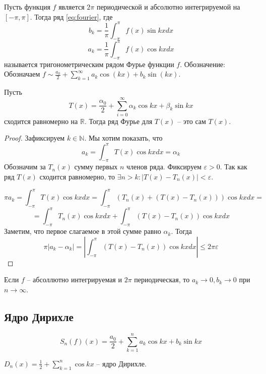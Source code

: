 \documentclass[document.tex]{subfiles}
\begin{document}
\begin{definition}
	Пусть функция $f$ является $2 \pi$ периодической и абсолютно интегрируемой на $[-\pi, \pi]$. Тогда ряд
    \ref{eq:fourier}, где
    $$b_k = \frac{1}{\pi}\int_{-\pi}^{\pi}f(x) \sin kx dx$$
	$$a_k = \frac{1}{\pi}\int_{-\pi}^{\pi}f(x) \cos kx dx$$
    называется тригонометрическим рядом Фурье функции $f$. Обозначение:
    Обозначаем $f \sim \frac{a_0}{2} + \sum_{k=1}^{\infty} a_k \cos(kx) + b_k \sin(kx)$.
\end{definition}

\begin{statement}
	Пусть $$T(x) = \frac{\alpha_0}{2} + \sum_{i=0}^{\infty} \alpha_k \cos kx + \beta_k \sin kx$$ сходится равномерно на $\mathbb{R}$. Тогда ряд Фурье для $T(x)$ -- это сам $T(x)$.
\end{statement}
\begin{proof}
    Зафиксируем $k \in \mathbb{N}$. Мы хотим показать, что 
    \[
        a_k = \int_{-\pi}^{\pi}T(x) \cos kxdx = \alpha_k
    \]
	Обозначим за $T_n(x)$ сумму первых $n$ членов ряда.
	Фиксируем $\varepsilon > 0$. Так как ряд $T(x)$ сходится равномерно, то $\exists n > k: |T(x) - T_n(x)| < \varepsilon$.

	$$\pi a_k = \int_{-\pi}^{\pi} T(x)\cos kx dx = \int_{-\pi}^{\pi} (T_n(x) + (T(x) - T_n(x))) \cos kx dx = $$
	$$= \int_{-\pi}^{\pi} T_n(x) \cos kx dx + \int_{-\pi}^{\pi} (T(x) - T_n(x)) \cos kx dx$$
    Заметим, что первое слагаемое в этой сумме равно $\alpha_k$.
	Тогда $$\pi |a_k - \alpha_k| = \left| \int_{-\pi}^{\pi}(T(x) - T_n(x)) \cos kx dx \right| \leq 2 \pi \varepsilon$$
\end{proof}
\begin{corollary}
	Если $f$ -- абсоллютно интегрируемая и $2 \pi$ периодическая, то $a_k \rightarrow 0, b_k \rightarrow 0$ при $n \rightarrow \infty$.
\end{corollary}

\subsection{Ядро Дирихле}

\begin{definition}
	$$S_n(f)(x) = \frac{a_0}{2} + \sum_{k = 1}^n a_k \cos kx + b_k \sin kx$$
\end{definition}

\begin{definition}
	$D_n(x) = \frac{1}{2} + \sum_{k=1}^n \cos kx$ -- ядро Дирихле.
\end{definition}
\end{document}
